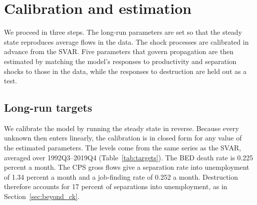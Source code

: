 \documentclass[authoryear, review, 12pt]{elsarticle}
\begin{document}
\section{Calibration and estimation}\label{sec:calibration}

We proceed in three steps. The long-run parameters are set so that the steady state reproduces average flows in the data. The shock processes are calibrated in advance from the SVAR. Five parameters that govern propagation are then estimated by matching the model's responses to productivity and separation shocks to those in the data, while the responses to destruction are held out as a test.

\subsection{Long-run targets}

We calibrate the model by running the steady state in reverse. Because every unknown then enters linearly, the calibration is in closed form for any value of the estimated parameters. The levels come from the same series as the SVAR, averaged over 1992Q3--2019Q4 (Table~\ref{tab:targets}). The BED death rate is 0.225 percent a month. The CPS gross flows give a separation rate into unemployment of 1.34 percent a month and a job-finding rate of 0.252 a month. Destruction therefore accounts for 17 percent of separations into unemployment, as in Section~\ref{sec:beyond_ck}.
\end{document}
